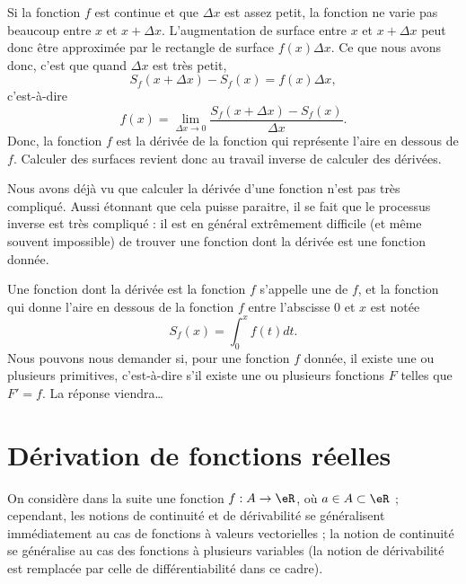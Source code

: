 Si la fonction $f$ est continue et que $\Delta x$ est assez petit, la fonction ne varie pas beaucoup entre $x$ et $x+\Delta x$. L'augmentation de surface entre $x$ et $x+\Delta x$ peut donc être approximée par le rectangle de surface $f(x)\Delta x$. Ce que nous avons donc, c'est que quand $\Delta x$ est très petit,
\begin{equation}
	S_f(x+\Delta x)-S_f(x)=f(x)\Delta x,
\end{equation}
c'est-à-dire
\begin{equation}
	f(x)=\lim_{\Delta x\to 0}\frac{  S_f(x+\Delta x)-S_f(x)}{ \Delta x }.
\end{equation}
Donc, la fonction $f$ est la dérivée de la fonction qui représente l'aire en dessous de $f$. Calculer des surfaces revient donc au travail inverse de calculer des dérivées.

Nous avons déjà vu que calculer la dérivée d'une fonction n'est pas très compliqué. Aussi étonnant que cela puisse paraitre, il se fait que le processus inverse est très compliqué : il est en général extrêmement difficile (et même souvent impossible) de trouver une fonction dont la dérivée est une fonction donnée.

Une fonction dont la dérivée est la fonction $f$ s'appelle une  de $f$, et la fonction qui donne l'aire en dessous de la fonction $f$ entre l'abscisse $0$ et $x$ est notée
\begin{equation}
	S_f(x)=\int_0^xf(t)dt.
\end{equation}
Nous pouvons nous demander si, pour une fonction $f$ donnée, il existe une ou plusieurs primitives, c'est-à-dire s'il existe une ou plusieurs fonctions $F$ telles que $F'=f$. La réponse viendra\ldots

\section{Dérivation de fonctions réelles}
\label{seccontetderiv}

On considère dans la suite une fonction $f : A \to \eR$, où $a \in A \subset \eR$ ; cependant, les notions de continuité et de dérivabilité se généralisent immédiatement au cas de fonctions à valeurs vectorielles ; la notion de continuité se généralise au cas des fonctions à plusieurs variables (la notion de dérivabilité est remplacée par celle de différentiabilité dans ce cadre).

